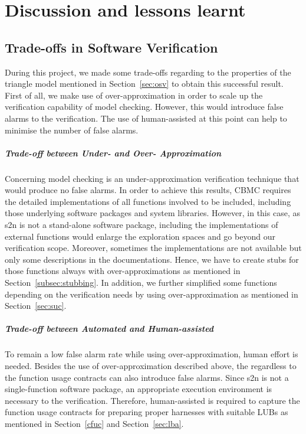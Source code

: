 \chapter{Discussion and lessons learnt}
\section{Trade-offs in Software Verification}
During this project, we made some trade-offs regarding to the properties of the triangle model mentioned in Section~\ref{sec:osv} to obtain this successful result. First of all, we make use of over-approximation in order to scale up the verification capability of model checking. However, this would introduce false alarms to the verification. The use of human-assisted at this point can help to minimise the number of false alarms.

\paragraph{Trade-off between Under- and Over- Approximation}
Concerning model checking is an under-approximation verification technique that would produce no false alarms. In order to achieve this results, CBMC requires the detailed implementations of all functions involved to be included, including those underlying software packages and system libraries. However, in this case, as s2n is not a stand-alone software package, including the implementations of external functions would enlarge the exploration spaces and go beyond our verification scope. Moreover, sometimes the implementations are not available but only some descriptions in the documentations. Hence, we have to create stubs for those functions always with over-approximations as mentioned in Section~\ref{subsec:stubbing}. In addition, we further simplified some functions depending on the verification needs by using over-approximation as mentioned in Section~\ref{sec:suc}.

\paragraph{Trade-off between Automated and Human-assisted} To remain a low false alarm rate while using over-approximation, human effort is needed. Besides the use of over-approximation described above, the regardless to the function usage contracts can also introduce false alarms. Since s2n is not a single-function software package, an appropriate execution environment is necessary to the verification. Therefore, human-assisted is required to capture the function usage contracts for preparing proper harnesses with suitable LUBs as mentioned in Section~\ref{cfuc} and Section~\ref{sec:lba}.


